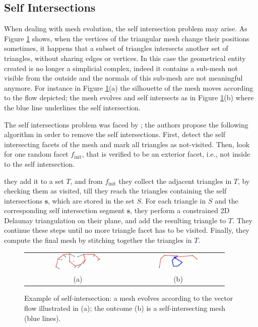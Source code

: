 \subsection{Self Intersections}
When dealing with mesh evolution, the self intersection problem may arise. 
As Figure \ref{fig:selfint} shows, when the vertices of the triangular mesh change their positions sometimes, it happens  that a subset of triangles intersects another set of triangles, without sharing edges or vertices. 
In this case the geometrical entity created is no longer a simplicial complex, indeed it contains a sub-mesh not visible from the outside and the normals of this sub-mesh are not meaningful anymore.
For instance in Figure \ref{fig:selfint}(a) the silhouette of the mesh moves according to the flow depicted;  the mesh evolves and self intersects  as in Figure \ref{fig:selfint}(b)  where the blue line underlines the self intersection.

The self intersections problem was faced by \cite{zaharescu2007transformesh}; the authors propose the following algorithm in order to remove the self intersections.
First, detect the self intersecting facets of the mesh and mark all triangles as not-visited.
Then, look for one random facet $f_{\text{init}}$, that is verified to be an exterior facet, i.e., not inside to the self intersection.

they add it to a set $\mathit{T}$, and from $f_{\text{init}}$ they collect the adjacent triangles in $\mathit{T}$, by checking them as visited, till they reach the triangles containing the self intersections $\mathbf{s}$, which are stored in the set $\mathit{S}$.  
For each triangle in $\mathit{S}$ and the corresponding self intersection segment $\mathbf{s}$, they perform a constrained 2D Delaunay triangulation on their plane, and add the resulting triangle to $\mathit{T}$.
They continue these steps until no more triangle facet has to be visited.
Finally,  they compute the final mesh by stitching together the triangles in $\mathit{T}$.

\begin{figure}
 \begin{tabular}{cc}
  \includegraphics[width=0.45\textwidth]{./img/selfinters01}&
  \includegraphics[width=0.45\textwidth]{./img/selfinters02}\\
  (a)&(b)
 \end{tabular}
 \caption{Example of self-intersection: a mesh evolves according to the vector flow illustrated in (a); the outcome (b) is a self-intersecting mesh (blue lines).}
 \label{fig:selfint}
\end{figure}


